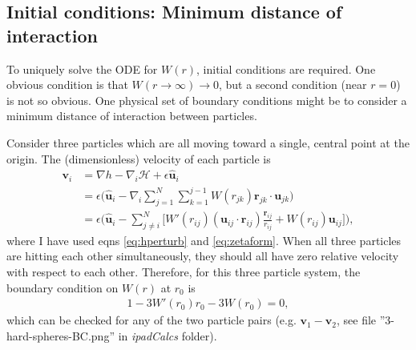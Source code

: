 \documentclass{article}
\begin{document}
\subsection{Initial conditions: Minimum distance of interaction}

To uniquely solve the ODE for $W(r)$, initial conditions are required. One obvious condition
is that $W(r\to\infty)\to0$, but a second condition (near $r=0$) is not so obvious. One
physical set of boundary conditions might be to consider a minimum distance of interaction
between particles.

Consider three particles which are all moving toward a single, central point at the origin.
The (dimensionless) velocity of each particle is
\begin{align}
  \bm{v}_i&=\nabla h -\nabla_i\mathcal{H} + \epsilon \bm{\hat{u}}_i\nonumber\\
          &=\epsilon \bigg(\bm{\hat{u}}_i-\nabla_i\sum_{j=1}^N\sum_{k=1}^{j-1}W(r_{jk})
            \bm{r}_{jk}\cdot\bm{u}_{jk}\bigg)\nonumber\\
          &=\epsilon \bigg(\bm{\hat{u}}_i-\sum_{j\neq i}^N \bigg[W'(r_{ij})
            (\bm{u}_{ij}\cdot\bm{r}_{ij})\frac{\bm{r}_{ij}}{r_{ij}}
            +W(r_{ij})\bm{u}_{ij}\bigg]\bigg),
\end{align}
where I have used eqns \ref{eq:hperturb} and \ref{eq:zetaform}. When all three particles are
hitting each other simultaneously, they should all have zero relative velocity with respect
to each other. Therefore, for this three particle system, the boundary condition on $W(r)$
at $r_0$ is
\begin{align}
  1-3W'(r_0)r_0-3W(r_0)=0,
\end{align}
which can be checked for any of the two particle pairs (e.g. $\bm{v}_1-\bm{v}_2$, see file
''3-hard-spheres-BC.png'' in \textit{ipadCalcs} folder).

\end{document}
